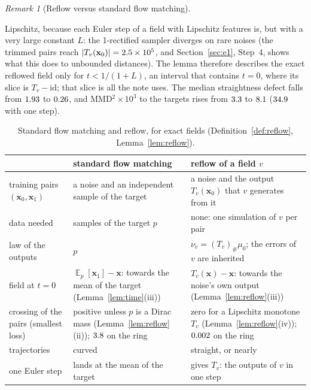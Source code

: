 \documentclass{article}
\DeclareMathOperator{\E}{\mathbb{E}}
\newcommand{\bx}{\mathbf{x}}
\theoremstyle{plain}
\theoremstyle{remark}
\newtheorem{remark}[theorem]{Remark}
\begin{document}
\begin{remark}[Reflow versus standard flow matching]
\begin{itemize}
Lipschitz, because each Euler step of a field with Lipschitz features is, but with a very large constant $L$: the 1-rectified sampler
diverges on rare noises (the trimmed pairs reach $|T_v(\bx_0)|=\rfEoneMax$, and Section~\ref{sec:e1}, Step~4, shows what this does to
unbounded distances). The lemma therefore describes the exact reflowed field only for $t<1/(1+L)$, an interval that contains $t=0$, where
its slice is $T_v-\mathrm{id}$; that slice is all the note uses. The median straightness
defect falls from $1.93$ to $0.26$, and MMD$^2\times10^3$ to the targets rises from $3.3$ to $8.1$ ($34.9$ with one step).
\end{itemize}
\end{remark}

\begin{table}[!htbp]
\centering
\caption{Standard flow matching and reflow, for exact fields (Definition~\ref{def:reflow}, Lemma~\ref{lem:reflow}).}
\label{tab:reflow}
\small
\begin{tabular}{p{} p{} p{}}
\toprule
& standard flow matching & reflow of a field $v$\\
\midrule
training pairs $(\bx_0,\bx_1)$ & a noise and an independent sample of the target & a noise and the output $T_v(\bx_0)$ that $v$ generates from it\\
data needed & samples of the target $p$ & none: one simulation of $v$ per pair\\
law of the outputs & $p$ & $\nu_v=(T_v)_\#\mu_0$; the errors of $v$ are inherited\\
field at $t=0$ & $\E_p[\bx_1]-\bx$: towards the mean of the target (Lemma~\ref{lem:time}(iii)) & $T_v(\bx)-\bx$: towards the noise's own output
(Lemma~\ref{lem:reflow}(iii))\\
crossing of the pairs (smallest loss) & positive unless $p$ is a Dirac mass (Lemma~\ref{lem:reflow}(ii)); $3.8$ on the ring & zero for a Lipschitz monotone $T_v$
(Lemma~\ref{lem:reflow}(iv)); $0.002$ on the ring\\
trajectories & curved & straight, or nearly\\
one Euler step & lands at the mean of the target & gives $T_v$: the outputs of $v$ in one step\\
\bottomrule
\end{tabular}
\end{table}
\end{document}
